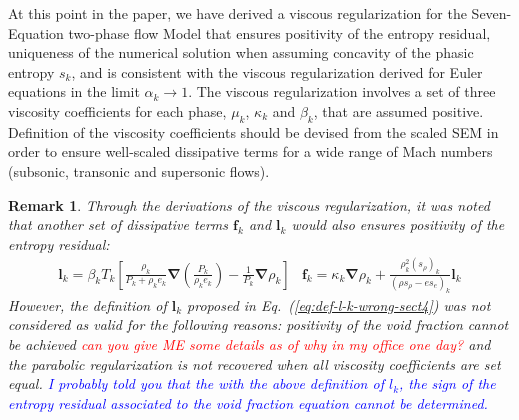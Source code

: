\documentclass[preprint,10pt]{elsarticle}
\newcommand{\grad}{\mbold{\nabla}}
\newcommand{\mbold}[1]{\boldsymbol#1}
\newtheorem*{remark}{Remark}
\newcommand{\eqt}[1]{Eq.~(\ref{#1})}                     %
\newcommand{\tcr}[1]{\textcolor{red}{#1}}
\newcommand{\tcb}[1]{\textcolor{blue}{#1}}
\begin{document}
%
At this point in the paper, we have derived a viscous regularization for the Seven-Equation two-phase flow Model that ensures positivity of the entropy residual, uniqueness of the numerical solution when assuming concavity of the phasic entropy $s_k$, and is consistent with the viscous regularization derived for Euler equations \cite{jlg, Marco_paper_low_mach} in the limit $\alpha_k \to 1$. The viscous regularization involves a set of three viscosity coefficients for each phase, $\mu_k$, $\kappa_k$ and $\beta_k$, that are assumed positive. Definition of the viscosity coefficients should be devised from the scaled SEM in order to ensure well-scaled dissipative terms for a wide range of Mach numbers (subsonic, transonic and supersonic flows).
%
\begin{remark}
Through the derivations of the viscous regularization, it was noted that another set of dissipative terms $\mbold f_k$ and $\mbold l_k$ would also ensures positivity of the entropy residual:
%
\begin{subequations}
\begin{align}\label{eq:def-l-k-wrong-sect4}
\mbold l_k =\beta_k T_k \left[ \frac{\rho_k}{P_k+\rho_k e_k} \grad \left( \frac{P_k}{\rho_k e_k} \right) - \frac{1}{P_k} \grad \rho_k \right]
\end{align}
\begin{align}
\mbold f_k = \kappa_k \grad \rho_k +  \frac{\rho^2_k (s_{\rho})_k}{\left( \rho s_{\rho} - e s_e \right)_k} \mbold l_k
\end{align}
\end{subequations}
%
However, the definition of $\mbold l_k$ proposed in \eqt{eq:def-l-k-wrong-sect4} was not considered as valid for the following reasons: positivity of the void fraction cannot be achieved \tcr{can you give ME some details as of why in my office one day?} and the parabolic regularization is not recovered when all viscosity coefficients are set equal. \tcb{I probably told you that the with the above definition of $l_k$, the sign of the entropy residual associated to the void fraction equation cannot be determined. }
\end{remark}
%
\end{document}
